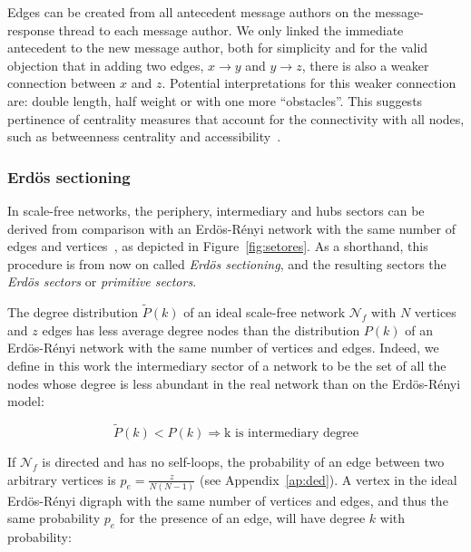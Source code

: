 \documentclass[%
 aip,
 jmp,%
 amsmath,amssymb,
 reprint,%
]{revtex4-1}
\begin{document}
Edges can be created from all antecedent message authors on the message-response thread to each message author.
We only linked the immediate antecedent to the new message author, both for simplicity and for the valid objection that in adding two edges, $x\rightarrow y$ and $y\rightarrow z$, there is also a weaker connection between $x$ and $z$. Potential interpretations for this weaker connection are: double length, half weight or with one more ``obstacles''. This suggests pertinence of centrality measures that account for the connectivity with all nodes, such as betweenness centrality and accessibility~\cite{luMeasures,access}.

\subsubsection{Erd\"os sectioning}\label{sectioning}
In scale-free networks, the periphery, intermediary and hubs sectors can be derived from comparison with an Erd\"os-R\'enyi network with the same number of edges and vertices~\cite{3setores}, as depicted in Figure~\ref{fig:setores}. As a shorthand, this procedure is from now on called \emph{Erd\"os sectioning}, and the resulting sectors the \emph{Erd\"os sectors} or \emph{primitive sectors}.

The degree distribution $\widetilde{P}(k)$ of an ideal
scale-free network $\mathcal{N}_f$ with $N$ vertices and $z$ edges has less
average degree nodes than the distribution $P(k)$ of an Erd\"os-R\'enyi
network with the same number of vertices and edges. Indeed, we define in this work the intermediary sector of a network to be the set of all the nodes whose degree is less abundant in the real network than on the Erd\"os-R\'enyi model:

\begin{equation}\label{criterio}
    \widetilde{P}(k)<P(k) \Rightarrow \text{k is intermediary degree}
\end{equation}

If $\mathcal{N}_f$ is directed and has no self-loops, the probability
of an edge between two arbitrary vertices is $p_e=\frac{z}{N(N-1)}$ (see Appendix~\ref{ap:ded}).
A vertex in the ideal Erd\"os-R\'enyi digraph with the same number of vertices and edges, and thus the same probability $p_e$ for the presence of an edge, will have degree $k$ with probability:
\end{document}
